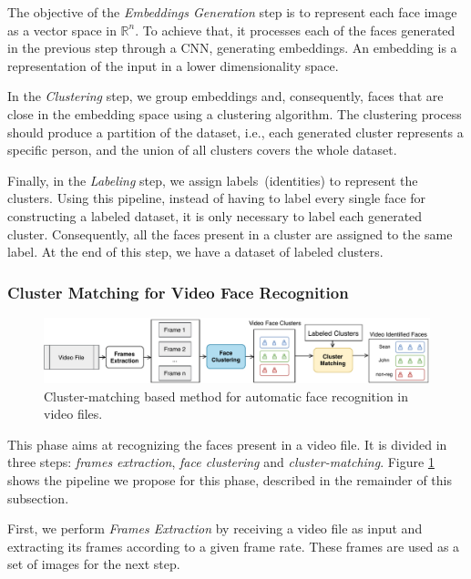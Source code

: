 The objective of the \textit{Embeddings Generation} step is to represent each face image as a vector space in $\mathbb{R}^{n}$.
To achieve that, it processes each of the faces generated in the previous step through a CNN, generating embeddings. 
An embedding is a representation of the input in a lower dimensionality space.

In the \textit{Clustering} step, we group embeddings and, consequently, faces that are close in the embedding space using a clustering algorithm. 
The clustering process should produce a partition of the dataset, i.e., each generated cluster represents a specific person, and the union of all clusters covers the whole dataset.

Finally, in the \textit{Labeling} step, we assign labels~(identities) to represent the clusters.
Using this pipeline, instead of having to label every single face for constructing a labeled dataset, it is only necessary to label each generated cluster.
Consequently, all the faces present in a cluster are assigned to the same label.
At the end of this step, we have a dataset of labeled clusters.

\subsubsection{Cluster Matching for Video Face Recognition}
\label{subsec:cluster_match}

\begin{figure}[!ht]
    \centering
    \includegraphics[width=\textwidth]{img/webmedia/video_face_recognition.pdf}
    \caption{Cluster-matching based method for automatic face recognition in video files.}
    \label{fig:cluster_matching}
\end{figure}

This phase aims at recognizing the faces present in a video file. 
It is divided in three steps: \emph{frames extraction}, \emph{face clustering} and \emph{cluster-matching}.
Figure \ref{fig:cluster_matching} shows the pipeline we propose for this phase, described in the remainder of this subsection.

First, we perform \textit{Frames Extraction} by receiving a video file as input and extracting its frames according to a given frame rate. 
These frames are used as a set of images for the next step.

